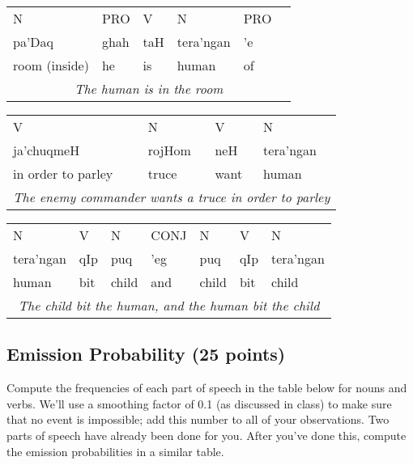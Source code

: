 \documentclass[11pt,twoside]{article}
\begin{document}
\begin{tabular}{llllll}
  N  & PRO  & V   & N         & PRO  \\
pa'Daq   & ghah & taH & tera'ngan & 'e   \\
room (inside)    & he   & is  & human     & of   \\ 
\multicolumn{6}{c}{{\em The human is in the room}} \\
\end{tabular}

\begin{tabular}{llll}
V   & N      & V    & N              \\
ja'chuqmeH & rojHom & neH  & tera'ngan        \\
in order to parley  & truce  & want & human \\
\multicolumn{4}{c}{{\em The enemy commander wants a truce in order to parley}}
\end{tabular}

\begin{tabular}{lllllll}
N         & V      & N     & CONJ & N         & V    & N \\
tera'ngan & qIp   & puq   & 'eg  & puq & qIp  & tera'ngan \\
human     & bit  & child & and  & child & bit & child \\
\multicolumn{7}{c}{{\em The child bit the human, and the human bit the child}}
\end{tabular}

\subsection{Emission Probability (25 points)}

Compute the frequencies of each part of speech in the table below for
nouns and verbs.  We'll use a smoothing factor of 0.1 (as discussed in
class) to make sure that no event is impossible; add this number to
all of your observations.  Two parts of speech have already been
done for you.  After you've done this, compute the emission probabilities in a similar table.
\end{document}
